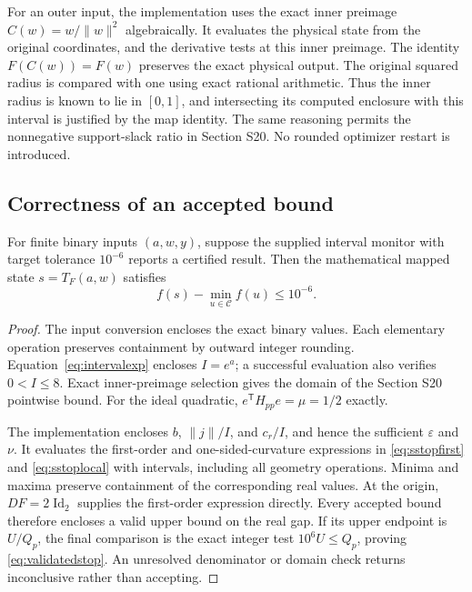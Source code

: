 For an outer input, the implementation uses the exact inner preimage $C(w)=w/\|w\|^2$ algebraically. It evaluates the physical state from the original coordinates, and the derivative tests at this inner preimage. The identity $F(C(w))=F(w)$ preserves the exact physical output. The original squared radius is compared with one using exact rational arithmetic. Thus the inner radius is known to lie in $[0,1]$, and intersecting its computed enclosure with this interval is justified by the map identity. The same reasoning permits the nonnegative support-slack ratio in Section S20. No rounded optimizer restart is introduced.

\subsection{Correctness of an accepted bound}
\begin{proposition}
\label{prop:validatedstop}
For finite binary inputs $(a,w,y)$, suppose the supplied interval monitor with target tolerance $10^{-6}$ reports a certified result. Then the mathematical mapped state $s=T_F(a,w)$ satisfies
\begin{equation}
 f(s)-\min_{u\in\mathcal C}f(u)\le10^{-6}.
 \label{eq:validatedstop}
\end{equation}
\end{proposition}
\begin{proof}
The input conversion encloses the exact binary values. Each elementary operation preserves containment by outward integer rounding. Equation~\eqref{eq:intervalexp} encloses $I=e^a$; a successful evaluation also verifies $0<I\le8$. Exact inner-preimage selection gives the domain of the Section S20 pointwise bound. For the ideal quadratic, $e^{\mathsf T}H_{pp}e=\mu=1/2$ exactly.

The implementation encloses $b$, $\|j\|/I$, and $c_r/I$, and hence the sufficient $\varepsilon$ and $\nu$. It evaluates the first-order and one-sided-curvature expressions in \eqref{eq:sstopfirst} and \eqref{eq:sstoplocal} with intervals, including all geometry operations. Minima and maxima preserve containment of the corresponding real values. At the origin, $DF=2\operatorname{Id}_2$ supplies the first-order expression directly. Every accepted bound therefore encloses a valid upper bound on the real gap. If its upper endpoint is $U/Q_p$, the final comparison is the exact integer test $10^6U\le Q_p$, proving \eqref{eq:validatedstop}. An unresolved denominator or domain check returns inconclusive rather than accepting.
\end{proof}

